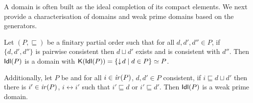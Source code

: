 A domain is often built as the ideal completion of its compact
elements. We next provide a characterisation of domains and weak prime
domains based on the generators.

\begin{lemma}
\label{le:generators}
  Let $(P,\sqsubseteq)$ be a finitary partial order such that 
 for all $d, d', d'' \in P$, if
  $\{ d, d', d''\}$ is pairwise consistent then $d \sqcup d'$ exists
  and is consistent with $d''$. Then $\mathsf{Idl}({P})$ is a domain with
  $\mathop{\mathsf{K}({\mathsf{Idl}({P})})} = \{ \mathop{\downarrow\!{d}} \mid d \in P \} \simeq P$.

  Additionally, let $P$ be {\wi} and for all $i \in \mathop{\mathit{ir}({P})}$,
  $d, d' \in P$ consistent, if $i \sqsubseteq d \sqcup d'$ then there
  is $i' \in \mathop{\mathit{ir}({P})}$, $i \leftrightarrow i'$ such that
  $i' \sqsubseteq d$ or $i' \sqsubseteq d'$. Then $\mathsf{Idl}({P})$ is a
  weak prime domain.
\end{lemma}


